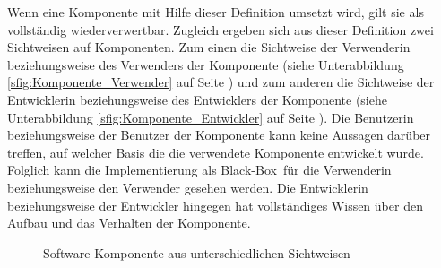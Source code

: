 Wenn eine Komponente mit Hilfe dieser Definition umsetzt wird, gilt sie als vollständig wiederverwertbar.
Zugleich ergeben sich aus dieser Definition zwei Sichtweisen auf Komponenten. Zum einen die Sichtweise der Verwenderin beziehungsweise des Verwenders der Komponente (siehe Unterabbildung \ref{sfig:Komponente_Verwender} auf Seite \pageref{sfig:Komponente_Verwender}) und zum anderen die Sichtweise der Entwicklerin beziehungsweise des Entwicklers der Komponente (siehe Unterabbildung \ref{sfig:Komponente_Entwickler} auf Seite \pageref{sfig:Komponente_Entwickler}). Die Benutzerin beziehungsweise der Benutzer der Komponente kann keine Aussagen darüber treffen, auf welcher Basis die die verwendete Komponente entwickelt wurde. Folglich kann die Implementierung als \glqq Black-Box\grqq\ für die Verwenderin beziehungsweise den Verwender gesehen werden. Die Entwicklerin beziehungsweise der Entwickler hingegen hat vollständiges Wissen über den Aufbau und das Verhalten der Komponente.

\begin{figure}[h]
  \centering
  \qquad
  \caption[
    Software-Komponente aus unterschiedlichen Sichtweisen
  ]{
    Software-Komponente aus unterschiedlichen Sichtweisen
  }
  \label{fig:Komponente_Sichtweise}
\end{figure}

